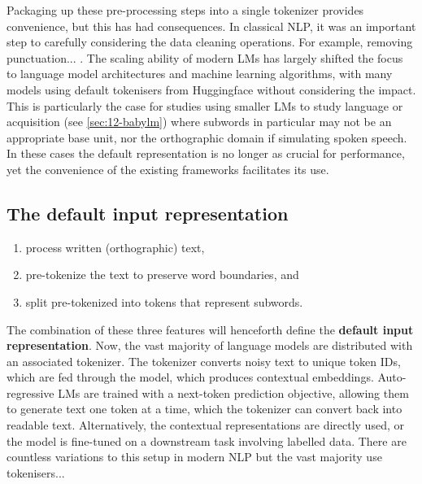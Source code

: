 Packaging up these pre-processing steps into a single tokenizer provides convenience, but this has had consequences. In classical NLP, it was an important step to carefully considering the data cleaning operations. For example, removing punctuation... \writemore. The scaling ability of modern LMs has largely shifted the focus to language model architectures and machine learning algorithms, with many models using default tokenisers from Huggingface without considering the impact. This is particularly the case for studies using smaller LMs to study language or acquisition (see \cref{sec:12-babylm}) where subwords in particular may not be an appropriate base unit, nor the orthographic domain if simulating spoken speech. In these cases the default representation is no longer as crucial for performance, yet the convenience of the existing frameworks facilitates its use. 

\subsection{The default input representation}\label{sec:12-default}




\begin{enumerate}
    \item process written (orthographic) text,
    \item pre-tokenize the text to preserve word boundaries, and
    \item split pre-tokenized into tokens that represent subwords.
\end{enumerate}

The combination of these three features will henceforth define the \textbf{default input representation}. Now, the vast majority of language models are distributed with an associated tokenizer. The tokenizer converts noisy text to unique token IDs, which are fed through the model, which produces contextual embeddings. Auto-regressive LMs are trained with a next-token prediction objective, allowing them to generate text one token at a time, which the tokenizer can convert back into readable text. Alternatively, the contextual representations are directly used, or the model is fine-tuned on a downstream task involving labelled data. There are countless variations to this setup in modern NLP but the vast majority use tokenisers...

